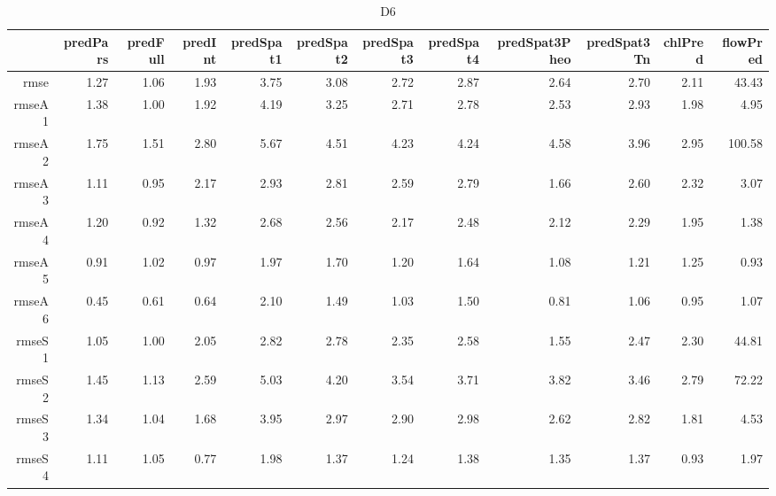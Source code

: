 \begin{table}[H]
\centering
\begingroup\fontsize{2.5pt}{4pt}\selectfont
\begin{tabular}{rrrrrrrrrrrr}
  \hline
 & predPars & predFull & predInt & predSpat1 & predSpat2 & predSpat3 & predSpat4 & predSpat3Pheo & predSpat3Tn & chlPred & flowPred \\ 
  \hline
rmse & 1.27 & 1.06 & 1.93 & 3.75 & 3.08 & 2.72 & 2.87 & 2.64 & 2.70 & 2.11 & 43.43 \\ 
  rmseA1 & 1.38 & 1.00 & 1.92 & 4.19 & 3.25 & 2.71 & 2.78 & 2.53 & 2.93 & 1.98 & 4.95 \\ 
  rmseA2 & 1.75 & 1.51 & 2.80 & 5.67 & 4.51 & 4.23 & 4.24 & 4.58 & 3.96 & 2.95 & 100.58 \\ 
  rmseA3 & 1.11 & 0.95 & 2.17 & 2.93 & 2.81 & 2.59 & 2.79 & 1.66 & 2.60 & 2.32 & 3.07 \\ 
  rmseA4 & 1.20 & 0.92 & 1.32 & 2.68 & 2.56 & 2.17 & 2.48 & 2.12 & 2.29 & 1.95 & 1.38 \\ 
  rmseA5 & 0.91 & 1.02 & 0.97 & 1.97 & 1.70 & 1.20 & 1.64 & 1.08 & 1.21 & 1.25 & 0.93 \\ 
  rmseA6 & 0.45 & 0.61 & 0.64 & 2.10 & 1.49 & 1.03 & 1.50 & 0.81 & 1.06 & 0.95 & 1.07 \\ 
  rmseS1 & 1.05 & 1.00 & 2.05 & 2.82 & 2.78 & 2.35 & 2.58 & 1.55 & 2.47 & 2.30 & 44.81 \\ 
  rmseS2 & 1.45 & 1.13 & 2.59 & 5.03 & 4.20 & 3.54 & 3.71 & 3.82 & 3.46 & 2.79 & 72.22 \\ 
  rmseS3 & 1.34 & 1.04 & 1.68 & 3.95 & 2.97 & 2.90 & 2.98 & 2.62 & 2.82 & 1.81 & 4.53 \\ 
  rmseS4 & 1.11 & 1.05 & 0.77 & 1.98 & 1.37 & 1.24 & 1.38 & 1.35 & 1.37 & 0.93 & 1.97 \\ 
   \hline
\end{tabular}
\endgroup
\caption{D6} 
\end{table}

